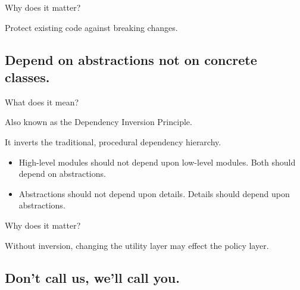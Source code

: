 \documentclass{beamer}
\begin{document}
\begin{frame}{Why does it matter?}
    \par Protect existing code against breaking changes.
\end{frame}

\begin{frame}{}
    
\end{frame}

\begin{frame}{}
    
\end{frame}

\subsection{Depend on abstractions not on concrete classes.}


\begin{frame}{What does it mean?}
    \par Also known as the Dependency Inversion Principle.
    \par It inverts the traditional, procedural dependency hierarchy.
    \begin{itemize}
        \item High-level modules should not depend upon low-level modules. Both should depend on abstractions.
        \item Abstractions should not depend upon details. Details should depend upon abstractions.
    \end{itemize}
\end{frame}

\begin{frame}{Why does it matter?}
    \par Without inversion, changing the utility layer may effect the policy layer. 
\end{frame}

\begin{frame}{}
    
\end{frame}

\begin{frame}{}
    
\end{frame}

\subsection{Don't call us, we'll call you.}
\end{document}
